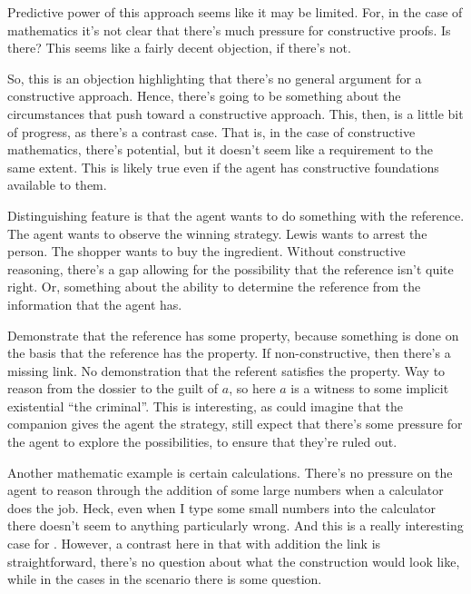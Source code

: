 \documentclass[10pt]{article}
\begin{document}
\begin{note}
  Predictive power of this approach seems like it may be limited.
  For, in the case of mathematics it's not clear that there's much pressure for constructive proofs.
  Is there?
  This seems like a fairly decent objection, if there's not.

  So, this is an objection highlighting that there's no general argument for a constructive approach.
  Hence, there's going to be something about the circumstances that push toward a constructive approach.
  This, then, is a little bit of progress, as there's a contrast case.
  That is, in the case of constructive mathematics, there's potential, but it doesn't seem like a requirement to the same extent.
  This is likely true even if the agent has constructive foundations available to them.

  Distinguishing feature is that the agent wants to do something with the reference.
  The agent wants to observe the winning strategy.
  Lewis wants to arrest the person.
  The shopper wants to buy the ingredient.
  Without constructive reasoning, there's a gap allowing for the possibility that the reference isn't quite right.
  Or, something about the ability to determine the reference from the information that the agent has.
\end{note}

\begin{note}
  Demonstrate that the reference has some property, because something is done on the basis that the reference has the property.
  If non-constructive, then there's a missing link.
  No demonstration that the referent satisfies the property.
  Way to reason from the dossier to the guilt of \(a\), so here \(a\) is a witness to some implicit existential ``the criminal''.
  This is interesting, as could imagine that the companion gives the agent the strategy, still expect that there's some pressure for the agent to explore the possibilities, to ensure that they're ruled out.
\end{note}

\begin{note}
  Another mathematic example is certain calculations.
  There's no pressure on the agent to reason through the addition of some large numbers when a calculator does the job.
  Heck, even when I type some small numbers into the calculator there doesn't seem to anything particularly wrong.
  And this is a really interesting case for \citeauthor{Lord:2018aa}.
  However, a contrast here in that with addition the link is straightforward, there's no question about what the construction would look like, while in the cases in the scenario there is some question.
\end{note}
\end{document}
